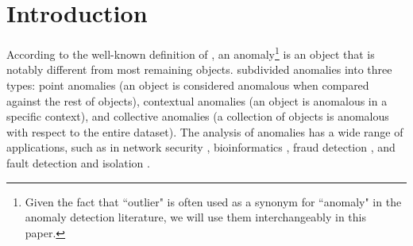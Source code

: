 \documentclass[pdflatex,sn-basic]{sn-jnl}%
\theoremstyle{thmstyleone}%
\theoremstyle{thmstyletwo}%
\theoremstyle{thmstylethree}%
\begin{document}

\maketitle

\section{Introduction}
\label{sec:introduction}

According to the well-known definition of \cite{hawkins1980identification}, an anomaly\footnote{Given the fact that ``outlier" is often used as a synonym for ``anomaly" in the anomaly detection literature, we will use them interchangeably in this paper.} is an object that is notably different from most remaining objects. \cite{chandola2009anomaly} subdivided anomalies into three types: point anomalies (an object is considered anomalous when compared against the rest of objects), contextual anomalies (an object is anomalous in a specific context), and collective anomalies (a collection of objects is anomalous with respect to the entire dataset). The analysis of anomalies has a wide range of applications, such as in network security  \citep{ahmed2016survey1}, bioinformatics \citep{spinosa2005support}, fraud detection \citep{ahmed2016survey2}, and fault detection and isolation \citep{hwang2009survey}.
\end{document}
